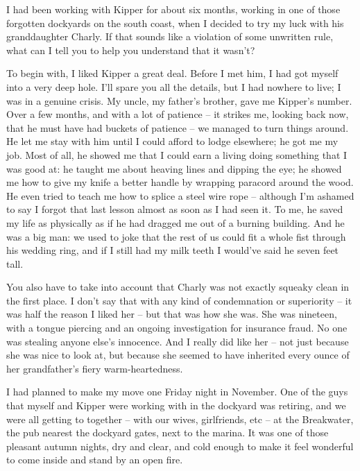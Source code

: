 

I had been working with Kipper for about six months, working in one of those forgotten dockyards on the south coast, when I decided to try my luck with his granddaughter Charly. If that sounds like a violation of some unwritten rule, what can I tell you to help you understand that it wasn't?

To begin with, I liked Kipper a great deal. Before I met him, I had got myself into a very deep hole. I'll spare you all the details, but I had nowhere to live; I was in a genuine crisis. My uncle, my father's brother, gave me Kipper's number. Over a few months, and with a lot of patience -- it strikes me, looking back now, that he must have had buckets of patience -- we managed to turn things around. He let me stay with him until I could afford to lodge elsewhere; he got me my job. Most of all, he showed me that I could earn a living doing something that I was good at: he taught me about heaving lines and dipping the eye; he showed me how to give my knife a better handle by wrapping paracord around the wood. He even tried to teach me how to splice a steel wire rope -- although I'm ashamed to say I forgot that last lesson almost as soon as I had seen it. To me, he saved my life as physically as if he had dragged me out of a burning building. And he was a big man: we used to joke that the rest of us could fit a whole fist through his wedding ring, and if I still had my milk teeth I would've said he seven feet tall.

You also have to take into account that Charly was not exactly squeaky clean in the first place. I don't say that with any kind of condemnation or superiority -- it was half the reason I liked her -- but that was how she was. She was nineteen, with a tongue piercing and an ongoing investigation for insurance fraud. No one was stealing anyone else's innocence. And I really did like her -- not just because she was nice to look at, but because she seemed to have inherited every ounce of her grandfather's fiery warm-heartedness.

\divsep

I had planned to make my move one Friday night in November. One of the guys that myself and Kipper were working with in the dockyard was retiring, and we were all getting to together -- with our wives, girlfriends, etc -- at the Breakwater, the pub nearest the dockyard gates, next to the marina. It was one of those pleasant autumn nights, dry and clear, and cold enough to make it feel wonderful to come inside and stand by an open fire.

